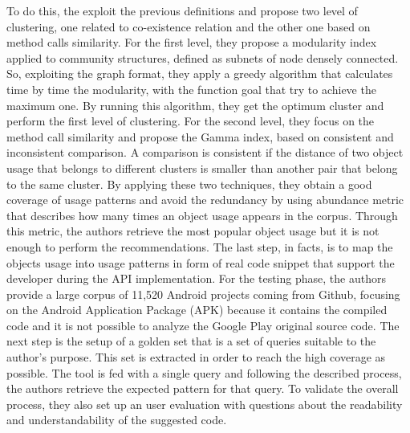 To do this, the exploit the previous definitions and propose two level of clustering, one related to co-existence relation and the other one based on method calls similarity. For the first level, they propose a modularity index applied to community structures, defined as subnets of node densely connected. So, exploiting the graph format, they apply a greedy algorithm that calculates time by time the modularity, with the function goal that try to achieve the maximum one. By running this algorithm, they get the optimum cluster and perform the first level of clustering. For the second level, they focus on the method call similarity and propose the Gamma index, based on consistent and inconsistent comparison. A comparison is consistent if the distance of two object usage that belongs to different clusters is smaller than another pair that belong to the same cluster. By applying these two techniques, they obtain a good coverage of usage patterns and avoid the redundancy by using abundance metric that describes how many times an object usage appears in the corpus. Through this metric, the authors retrieve the most popular object usage but it is not enough to perform the recommendations. The last step, in facts, is to map the objects usage into usage patterns in form of real code snippet that support the developer during the API implementation. For the testing phase, the authors provide a large corpus of 11,520 Android projects coming from Github, focusing on the Android Application Package (APK) because it contains the compiled code and it is not possible to analyze the Google Play original source code. The next step is the setup of a golden set that is a set of queries suitable to the author's purpose. This set is extracted in order to reach the high coverage as possible. The tool is fed with a single query and following the described process, the authors retrieve the expected pattern for that query. To validate the overall process, they also set up an user evaluation with questions about the readability and understandability of the suggested code.

